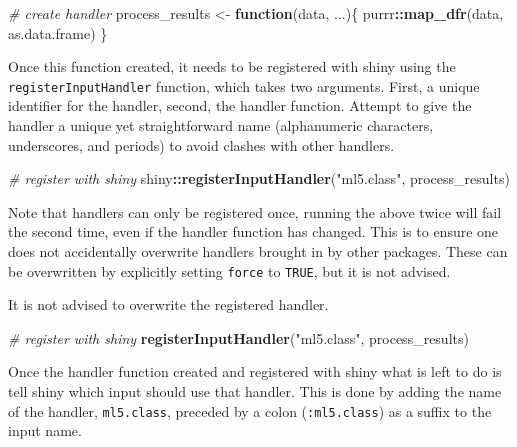 \documentclass[
]{krantz}
\makeatletter
\newenvironment{Shaded}{\begin{snugshade}}{\end{snugshade}}
\newcommand{\CommentTok}[1]{\textcolor[rgb]{0.37,0.37,0.37}{\textit{#1}}}
\newcommand{\ControlFlowTok}[1]{\textcolor[rgb]{0.27,0.27,0.27}{\textbf{#1}}}
\newcommand{\KeywordTok}[1]{\textcolor[rgb]{0.27,0.27,0.27}{\textbf{#1}}}
\newcommand{\NormalTok}[1]{#1}
\newcommand{\OperatorTok}[1]{\textcolor[rgb]{0.43,0.43,0.43}{\textbf{#1}}}
\newcommand{\StringTok}[1]{\textcolor[rgb]{0.5,0.5,0.5}{#1}}
\newenvironment{kframe}{%
\medskip{}
\setlength{\fboxsep}{.8em}
 \def\at@end@of@kframe{}%
 \ifinner\ifhmode%
  \def\at@end@of@kframe{\end{minipage}}%
  \begin{minipage}{\columnwidth}%
 \fi\fi%
 \def\FrameCommand##1{\hskip\@totalleftmargin \hskip-\fboxsep
 \colorbox{shadecolor}{##1}\hskip-\fboxsep
     \hskip-\linewidth \hskip-\@totalleftmargin \hskip\columnwidth}%
 \MakeFramed {\advance\hsize-\width
   \@totalleftmargin\z@ \linewidth\hsize
   \@setminipage}}%
 {\par\unskip\endMakeFramed%
 \at@end@of@kframe}
\renewenvironment{Shaded}{\begin{kframe}}{\end{kframe}}
\newenvironment{rmdblock}[1]
  {
  \begin{itemize}
  \renewcommand{\labelitemi}{
    \raisebox{-.7\height}[0pt][0pt]{
      {\setkeys{Gin}{width=3em,keepaspectratio}\texttt{[image: images/\#1]}}
    }
  }
  \setlength{\fboxsep}{1em}
  \begin{kframe}
  \item
  }
  {
  \end{kframe}
  \end{itemize}
  }
\newenvironment{rmdnote}
  {\begin{rmdblock}{note}}
  {\end{rmdblock}}
\makeatother
\begin{document}
\begin{Shaded}
\begin{Highlighting}[]
\CommentTok{\# create handler}
\NormalTok{process\_results <{-}}\StringTok{ }\ControlFlowTok{function}\NormalTok{(data, ...)\{}
\NormalTok{  purrr}\OperatorTok{::}\KeywordTok{map\_dfr}\NormalTok{(data, as.data.frame)}
\NormalTok{\}}
\end{Highlighting}
\end{Shaded}

Once this function created, it needs to be registered with shiny using the \texttt{registerInputHandler} function, which takes two arguments. First, a unique identifier for the handler, second, the handler function. Attempt to give the handler a unique yet straightforward name (alphanumeric characters, underscores, and periods) to avoid clashes with other handlers.

\begin{Shaded}
\begin{Highlighting}[]
\CommentTok{\# register with shiny}
\NormalTok{shiny}\OperatorTok{::}\KeywordTok{registerInputHandler}\NormalTok{(}\StringTok{"ml5.class"}\NormalTok{, process\_results)}
\end{Highlighting}
\end{Shaded}

Note that handlers can only be registered once, running the above twice will fail the second time, even if the handler function has changed. This is to ensure one does not accidentally overwrite handlers brought in by other packages. These can be overwritten by explicitly setting \texttt{force} to \texttt{TRUE}, but it is not advised.

\begin{rmdnote}
It is not advised to overwrite the registered handler.
\end{rmdnote}

\begin{Shaded}
\begin{Highlighting}[]
\CommentTok{\# register with shiny}
\KeywordTok{registerInputHandler}\NormalTok{(}\StringTok{"ml5.class"}\NormalTok{, process\_results)}
\end{Highlighting}
\end{Shaded}

Once the handler function created and registered with shiny what is left to do is tell shiny which input should use that handler. This is done by adding the name of the handler, \texttt{ml5.class}, preceded by a colon (\texttt{:ml5.class}) as a suffix to the input name.
\end{document}
